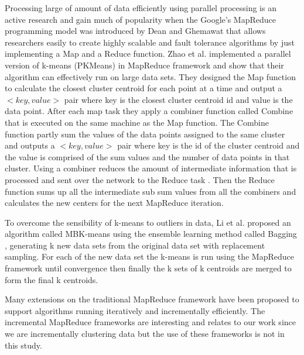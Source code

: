 Processing large of amount of data efficiently using parallel processing is an active research and gain much of popularity when the Google's MapReduce programming model was introduced by Dean and Ghemawat \citep{Dean:2004} that allows researchers easily to create highly scalable and fault tolerance algorithms by just implementing a Map and a Reduce function. Zhao et al. \citep{Zhao:2009} implemented a parallel version of k-means (PKMeans) in MapReduce framework and show that their algorithm can effectively run on large data sets. They designed the Map function to calculate the closest cluster centroid for each point at a time and output a $<key, value>$ pair where key is the closest cluster centroid id and value is the data point. After each map task they apply a combiner function called Combine that is executed on the same machine as the Map function. The Combine function partly sum the values of the data points assigned to the same cluster and outputs a $<key, value>$ pair where key is the id of the cluster centroid and the value is comprised of the sum values and the number of data points in that cluster. Using a combiner reduces the amount of intermediate information that is processed and sent over the network to the Reduce task \citep{Dean:2004, Zhao:2009}. Then the Reduce function sums up all the intermediate sub sum values from all the combiners and calculates the new centers for the next MapReduce iteration. 

To overcome the sensibility of k-means to outliers in data, Li et al. \citep{Li:2011} proposed an algorithm called MBK-means using the ensemble learning method called Bagging \citep{Breiman:1996}, generating k new data sets from the original data set with replacement sampling. For each of the new data set the k-means is run using the MapReduce framework until convergence then finally the k sets of k centroids are merged to form the final k centroids. 

Many extensions on the traditional MapReduce framework have been proposed to support algorithms running iteratively \citep{Condie:2010HadoopOnline, Ekanayake:2010Twister, Zaharia:2010Spark, Bu:2010HaLoop, Bu:2012HaLoop, Yan:2012IncMr} and incrementally \citep{Bhatotia:2011Incoop, Yan:2012IncMr, Bhatotia:2012Slider} efficiently. The incremental MapReduce frameworks are interesting and relates to our work since we are incrementally clustering data but the use of these frameworks is not in this study.

